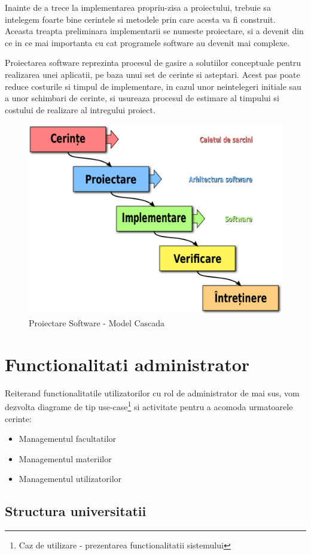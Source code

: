 \documentclass[12pt, a4paper, oneside, romanian]{teza-upb}
\begin{document}
Inainte de a trece la implementarea propriu-zisa a proiectului, trebuie sa intelegem foarte bine cerintele si metodele prin care acesta va fi construit. Aceasta treapta preliminara implementarii se numeste proiectare, si a devenit din ce in ce mai importanta cu cat programele software au devenit mai complexe.

Proiectarea software reprezinta procesul de gasire a solutiilor conceptuale pentru realizarea unei aplicatii, pe baza unui set de cerinte si asteptari. Acest pas poate reduce costurile si timpul de implementare, in cazul unor neintelegeri initiale sau a unor schimbari de cerinte, si usureaza procesul de estimare al timpului si costului de realizare al intregului proiect.

\begin{figure}[H]
\centering
\includegraphics*[width=0.55\columnwidth]{proiectare-software-model-cascada}
\caption{Proiectare Software - Model Cascada}
\label{proiectare-software-model-cascada}
\end{figure}

\section{Functionalitati administrator}

Reiterand functionalitatile utilizatorilor cu rol de administrator de mai sus, vom dezvolta diagrame de tip use-case\footnote{Caz de utilizare - prezentarea functionalitatii sistemului} si activitate pentru a acomoda urmatoarele cerinte:
\begin{itemize}
	\item Managementul facultatilor
	\item Managementul materiilor
	\item Managementul utilizatorilor
\end{itemize}

\subsection{Structura universitatii}
\end{document}
